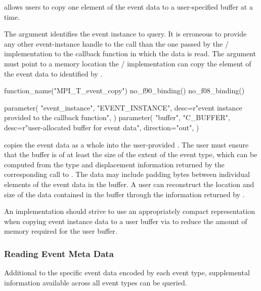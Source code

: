  allows users to copy one element of the event
data to a user-specified buffer at a time.

The  argument identifies the event instance to
query. It is erroneous to provide any other event-instance handle to the
call than the one passed by the \MPI/ implementation to the callback
function in which the data is read.  The  argument must point
to a memory location the \MPI/ implementation can copy the element
of the event data to identified by .

\begin{mpi-binding}
    function_name("MPI_T_event_copy")
    no_f90_binding()
    no_f08_binding()

    parameter(
        "event_instance",
        "EVENT_INSTANCE",
        desc=r"event instance provided to the callback function",
    )
    parameter(
        "buffer",
        "C_BUFFER",
        desc=r"user-allocated buffer for event data",
        direction="out",
    )
\end{mpi-binding}

 copies the event data as a whole into the
user-provided . The user must ensure that the buffer is of
at least the size of the extent of the event type, which can be computed from the type and displacement information returned by the
corresponding call to . The data may
include padding bytes between individual elements of the event data in the
buffer. A user can reconstruct the location and size of the data contained
in the buffer through the information returned by
.

\begin{implementors}
    An implementation should strive to use an appropriately compact
    representation when copying event instance data to a user buffer via
     to reduce the amount of memory required for
    the user buffer.
\end{implementors}

\subsubsection{Reading Event Meta Data}
\label{sec:tools:mpit:events:metadata}

Additional to the specific event data encoded by each event type,
supplemental information available across all event types can be queried.

